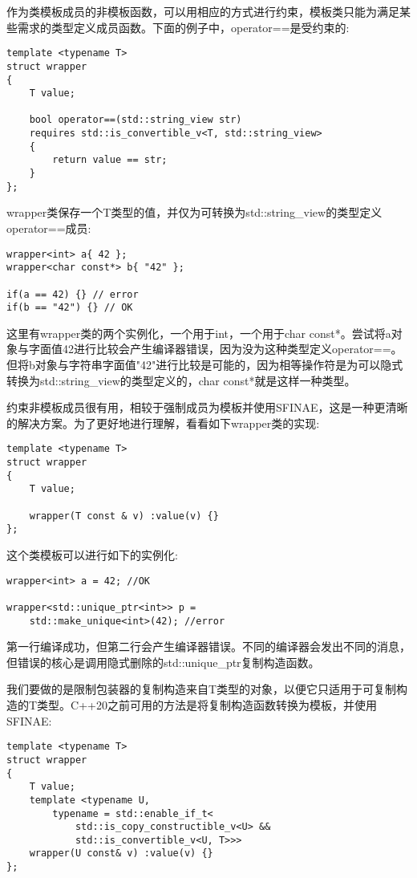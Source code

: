 作为类模板成员的非模板函数，可以用相应的方式进行约束，模板类只能为满足某些需求的类型定义成员函数。下面的例子中，operator==是受约束的:

\begin{lstlisting}[style=styleCXX]
template <typename T>
struct wrapper
{
	T value;
	
	bool operator==(std::string_view str)
	requires std::is_convertible_v<T, std::string_view>
	{
		return value == str;
	}
};
\end{lstlisting}

wrapper类保存一个T类型的值，并仅为可转换为std::string\_view的类型定义operator==成员:

\begin{lstlisting}[style=styleCXX]
wrapper<int> a{ 42 };
wrapper<char const*> b{ "42" };

if(a == 42) {} // error
if(b == "42") {} // OK
\end{lstlisting}

这里有wrapper类的两个实例化，一个用于int，一个用于char const*。尝试将a对象与字面值42进行比较会产生编译器错误，因为没为这种类型定义operator==。但将b对象与字符串字面值"42"进行比较是可能的，因为相等操作符是为可以隐式转换为std::string\_view的类型定义的，char const*就是这样一种类型。

约束非模板成员很有用，相较于强制成员为模板并使用SFINAE，这是一种更清晰的解决方案。为了更好地进行理解，看看如下wrapper类的实现:

\begin{lstlisting}[style=styleCXX]
template <typename T>
struct wrapper
{
	T value;
	
	wrapper(T const & v) :value(v) {}
};
\end{lstlisting}

这个类模板可以进行如下的实例化:

\begin{lstlisting}[style=styleCXX]
wrapper<int> a = 42; //OK

wrapper<std::unique_ptr<int>> p =
	std::make_unique<int>(42); //error
\end{lstlisting}

第一行编译成功，但第二行会产生编译器错误。不同的编译器会发出不同的消息，但错误的核心是调用隐式删除的std::unique\_ptr复制构造函数。

我们要做的是限制包装器的复制构造来自T类型的对象，以便它只适用于可复制构造的T类型。C++20之前可用的方法是将复制构造函数转换为模板，并使用SFINAE:

\begin{lstlisting}[style=styleCXX]
template <typename T>
struct wrapper
{
	T value;
	template <typename U,
		typename = std::enable_if_t<
			std::is_copy_constructible_v<U> &&
			std::is_convertible_v<U, T>>>
	wrapper(U const& v) :value(v) {}
};
\end{lstlisting}


